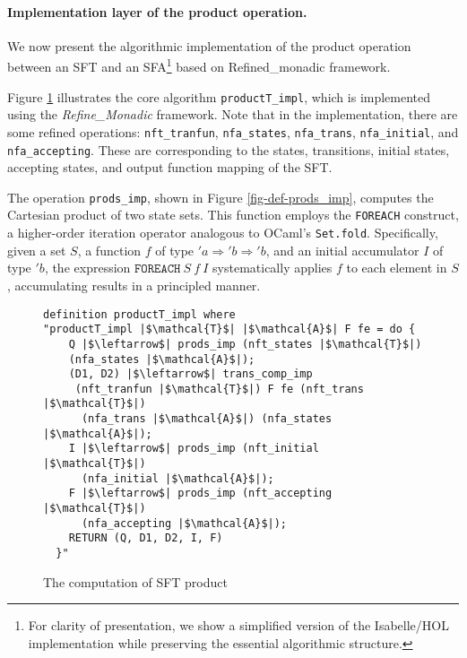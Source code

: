 \paragraph{Implementation layer of the product operation.} We now present the algorithmic implementation of the product operation between an SFT and an SFA\footnote{For clarity of presentation, we show a simplified version of the Isabelle/HOL implementation while preserving the essential algorithmic structure.} based on Refined\_monadic framework.

Figure \ref{fig-compute-nft-product} illustrates the core algorithm \texttt{productT\_impl}, which is implemented using the \emph{Refine\_Monadic} framework. Note that in the implementation, there are some refined operations: \texttt {nft\_tranfun}, \texttt{nfa\_states}, \texttt{nfa\_trans}, \texttt{nfa\_initial}, and \texttt{nfa\_accepting}. These are corresponding to the states, transitions, initial states, accepting states, and output function mapping of the SFT.

The operation \texttt{prods\_imp}, shown in Figure \ref{fig-def-prods_imp}, computes the Cartesian product of two state sets. This function employs the \texttt{FOREACH} construct, a higher-order iteration operator analogous to OCaml's \texttt{Set.fold}. Specifically, given a set $S$, a function $f$ of type $'a \Rightarrow 'b \Rightarrow 'b$, and an initial accumulator $I$ of type $'b$, the expression $\texttt{FOREACH}~S~f~I$ systematically applies $f$ to each element in $S$, accumulating results in a principled manner.




\begin{figure}[hbt!]
	\begin{lstlisting}
definition productT_impl where
"productT_impl |$\mathcal{T}$| |$\mathcal{A}$| F fe = do {
    Q |$\leftarrow$| prods_imp (nft_states |$\mathcal{T}$|) 
    (nfa_states |$\mathcal{A}$|);
    (D1, D2) |$\leftarrow$| trans_comp_imp 
     (nft_tranfun |$\mathcal{T}$|) F fe (nft_trans |$\mathcal{T}$|) 
      (nfa_trans |$\mathcal{A}$|) (nfa_states |$\mathcal{A}$|);
    I |$\leftarrow$| prods_imp (nft_initial |$\mathcal{T}$|)
      (nfa_initial |$\mathcal{A}$|);
    F |$\leftarrow$| prods_imp (nft_accepting |$\mathcal{T}$|) 
      (nfa_accepting |$\mathcal{A}$|);
    RETURN (Q, D1, D2, I, F)
  }"
\end{lstlisting}
\caption{The computation of SFT product}
\label{fig-compute-nft-product}
\end{figure}



